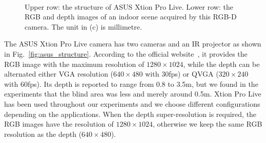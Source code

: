 \begin{figure}[!ht]
\centering
{}\\
\caption{Upper row: the structure of ASUS Xtion Pro Live. Lower row: the RGB and depth images of an indoor scene acquired by this RGB-D camera. The unit in (c) is millimetre.}
\label{fig:asus_illustration}
\end{figure}
The ASUS Xtion Pro Live camera has two cameras and an IR projector as shown in Fig.~\ref{fig:asus_structure}.
According to the official website~\cite{asus}, it provides the RGB image with the maximum resolution of $1280\times1024$, while the depth can be alternated either VGA resolution ($640\times480$ with 30fps) or QVGA ($320\times240$ with 60fps). 
Its depth is reported to range from 0.8 to 3.5m, but we found in the experiments that the blind area was less and merely around 0.5m.  
Xtion Pro Live has been used throughout our experiments and we choose different configurations depending on the applications.
When the depth super-resolution is required, the RGB images have the resolution of $1280\times1024$, otherwise we keep the same RGB resolution as the depth ($640\times480$).


